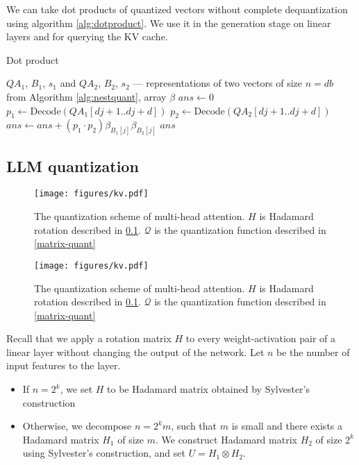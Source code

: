 We can take dot products of quantized vectors without complete dequantization using algorithm \ref{alg:dotproduct}. We use it in the generation stage on linear layers and for querying the KV cache.

\begin{algorithm}[h]
\caption{Dot product}
\label{alg:dotproduct}
\begin{algorithmic}
    $QA_1$, $B_1$, $s_1$ and $QA_2$, $B_2$, $s_2$ --- representations of two vectors of size $n = db$ from Algorithm \ref{alg:nestquant}, array $\beta$
   \State $ans \leftarrow 0$
        \State $p_1 \leftarrow \text{Decode}(QA_1[dj+1..dj+d])$
        \State $p_2 \leftarrow \text{Decode}(QA_2[dj+1..dj+d])$
        \State $ans \leftarrow ans + (p_1 \cdot p_2)\beta_{B_1[j]}\beta_{B_2[j]}$
   \EndFor
    $ans$
\end{algorithmic}
\end{algorithm}

\subsection{LLM quantization}

\label{subsec:llm-quant}

\ifisicml
\begin{figure}
    \centering
    \texttt{[image: figures/kv.pdf]}
    \caption{The quantization scheme of multi-head attention. $H$ is Hadamard rotation described in \ref{subsec:llm-quant}. $\mathcal{Q}$ is the quantization function described in \ref{matrix-quant}}
    \label{fig:scheme}
\end{figure}

\else
\begin{figure}[h]
    \centering
    \texttt{[image: figures/kv.pdf]}
    \caption{The quantization scheme of multi-head attention. $H$ is Hadamard rotation described in \ref{subsec:llm-quant}. $\mathcal{Q}$ is the quantization function described in \ref{matrix-quant}}
    \label{fig:scheme}
\end{figure}

\fi

Recall that we apply a rotation matrix $H$ to every weight-activation pair of a linear layer without changing the output of the network. Let $n$ be the number of input features to the layer.

\begin{itemize}
    \item If $n = 2^k$, we set $H$ to be Hadamard matrix obtained by Sylvester's construction
    \item Otherwise, we decompose $n = 2^km$, such that $m$ is small and there exists a Hadamard matrix $H_1$ of size $m$. We construct Hadamard matrix $H_2$ of size $2^k$ using Sylvester's construction, and set $U = H_1 \otimes H_2$.
\end{itemize}

